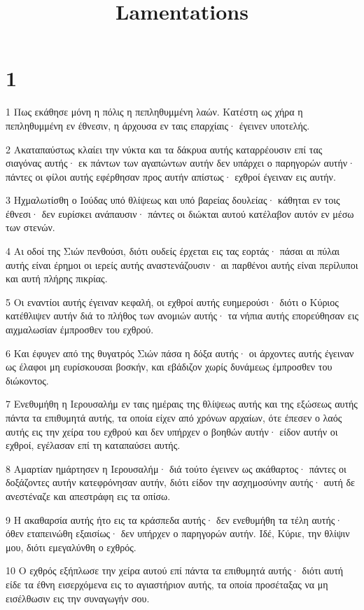 

\title{Lamentations}


\chapter{1}

\par 1 Πως εκάθησε μόνη η πόλις η πεπληθυμμένη λαών. Κατέστη ως χήρα η πεπληθυμμένη εν έθνεσιν, η άρχουσα εν ταις επαρχίαις· έγεινεν υποτελής.
\par 2 Ακαταπαύστως κλαίει την νύκτα και τα δάκρυα αυτής καταρρέουσιν επί τας σιαγόνας αυτής· εκ πάντων των αγαπώντων αυτήν δεν υπάρχει ο παρηγορών αυτήν· πάντες οι φίλοι αυτής εφέρθησαν προς αυτήν απίστως· εχθροί έγειναν εις αυτήν.
\par 3 Ηχμαλωτίσθη ο Ιούδας υπό θλίψεως και υπό βαρείας δουλείας· κάθηται εν τοις έθνεσι· δεν ευρίσκει ανάπαυσιν· πάντες οι διώκται αυτού κατέλαβον αυτόν εν μέσω των στενών.
\par 4 Αι οδοί της Σιών πενθούσι, διότι ουδείς έρχεται εις τας εορτάς· πάσαι αι πύλαι αυτής είναι έρημοι οι ιερείς αυτής αναστενάζουσιν· αι παρθένοι αυτής είναι περίλυποι και αυτή πλήρης πικρίας.
\par 5 Οι εναντίοι αυτής έγειναν κεφαλή, οι εχθροί αυτής ευημερούσι· διότι ο Κύριος κατέθλιψεν αυτήν διά το πλήθος των ανομιών αυτής· τα νήπια αυτής επορεύθησαν εις αιχμαλωσίαν έμπροσθεν του εχθρού.
\par 6 Και έφυγεν από της θυγατρός Σιών πάσα η δόξα αυτής· οι άρχοντες αυτής έγειναν ως έλαφοι μη ευρίσκουσαι βοσκήν, και εβάδιζον χωρίς δυνάμεως έμπροσθεν του διώκοντος.
\par 7 Ενεθυμήθη η Ιερουσαλήμ εν ταις ημέραις της θλίψεως αυτής και της εξώσεως αυτής πάντα τα επιθυμητά αυτής, τα οποία είχεν από χρόνων αρχαίων, ότε έπεσεν ο λαός αυτής εις την χείρα του εχθρού και δεν υπήρχεν ο βοηθών αυτήν· είδον αυτήν οι εχθροί, εγέλασαν επί τη καταπαύσει αυτής.
\par 8 Αμαρτίαν ημάρτησεν η Ιερουσαλήμ· διά τούτο έγεινεν ως ακάθαρτος· πάντες οι δοξάζοντες αυτήν κατεφρόνησαν αυτήν, διότι είδον την ασχημοσύνην αυτής· αυτή δε ανεστέναζε και απεστράφη εις τα οπίσω.
\par 9 Η ακαθαρσία αυτής ήτο εις τα κράσπεδα αυτής· δεν ενεθυμήθη τα τέλη αυτής· όθεν εταπεινώθη εξαισίως· δεν υπήρχεν ο παρηγορών αυτήν. Ιδέ, Κύριε, την θλίψιν μου, διότι εμεγαλύνθη ο εχθρός.
\par 10 Ο εχθρός εξήπλωσε την χείρα αυτού επί πάντα τα επιθυμητά αυτής· διότι αυτή είδε τα έθνη εισερχόμενα εις το αγιαστήριον αυτής, τα οποία προσέταξας να μη εισέλθωσιν εις την συναγωγήν σου.
